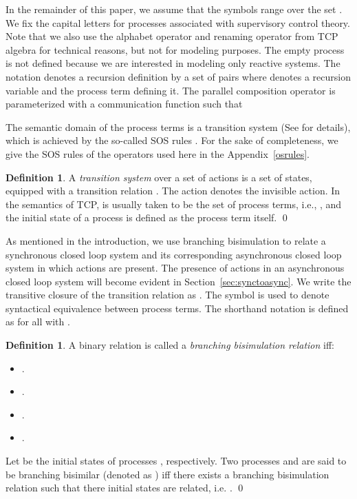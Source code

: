 \documentclass[copyright]{eptcs}
\theoremstyle{plain}
\theoremstyle{definition}
\newtheorem{definition}[theorem]{Definition}
\begin{document}
\begin{center}

\end{center}

In the remainder of this paper, we assume that the symbols  range over the set . We fix the capital letters  for processes associated with supervisory control theory. Note that we also use the alphabet operator  and renaming operator  from TCP algebra for technical reasons, but not for modeling purposes. The empty process  is not defined because we are interested in modeling only reactive systems. The notation  denotes a recursion definition by a set of pairs  where  denotes a recursion variable and  the process term defining it. The parallel composition operator is parameterized with a communication function  such that 

The semantic domain of the process terms is a transition system (See \citep{acpbook} for details), which is achieved by the so-called SOS rules \citep{SOS}. For the sake of completeness, we give the SOS rules of the operators used here in the Appendix~\ref{osrules}.

\begin{definition}
A \emph{transition system} over a set of actions  is a set  of states, equipped with a transition relation . The action  denotes the invisible action. In the semantics of TCP,  is usually taken to be the set of process terms, i.e., , and the initial state of a process is defined as the process term itself. \qed
\end{definition}


As mentioned in the introduction, we use branching bisimulation to relate a synchronous closed loop system and its corresponding asynchronous closed loop system in which  actions are present. The presence of  actions in an asynchronous closed loop system will become evident in Section~\ref{sec:synctoasync}. We write the transitive closure of the transition relation  as . The symbol  is used to denote syntactical equivalence between process terms. The shorthand notation  is defined as  for all  with .

\begin{definition}\label{def-bb}
A binary relation  is called a \emph{branching bisimulation relation} \citep{acpbook,Glabeek90} iff:
\begin{itemize}
\item .
\item .
\item .
\item .
\end{itemize}
Let  be the initial states of processes , respectively. Two processes  and  are said to be branching bisimilar (denoted as ) iff there exists a branching bisimulation relation  such that there initial states  are related, i.e. . \qed
\end{definition}
\end{document}
